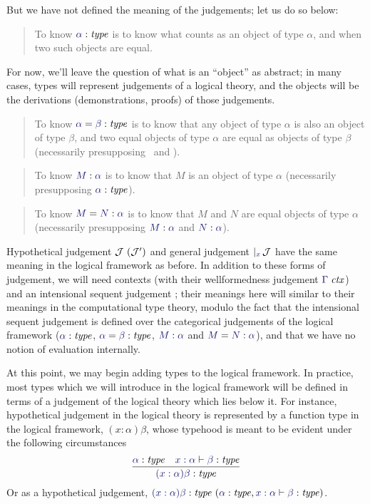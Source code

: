 \documentclass[main.tex]{subfiles}
\begin{document}
But we have not defined the meaning of the judgements; let us do so below:

\begin{quote}
  To know $\type\alpha$ is to know what counts as an object of type $\alpha$,
  and when two such objects are equal.
\end{quote}

For now, we'll leave the question of what is an ``object'' as
abstract; in many cases, types will represent judgements of a logical
theory, and the objects will be the derivations (demonstrations,
proofs) of those judgements.

\begin{quote}
  To know $\etype{\alpha}{\beta}$ is to know that any object of type $\alpha$ is
  also an object of type $\beta$, and two equal objects of type $\alpha$ are
  equal as objects of type $\beta$ (necessarily presupposing \type\alpha\ and
  \type\beta).
\end{quote}

\begin{quote}
  To know $\ofty{M}{\alpha}$ is to know that $M$ is an object of type $\alpha$
  (necessarily presupposing $\type\alpha$).
\end{quote}

\begin{quote}
  To know $\eofty{M}{N}{\alpha}$ is to know that $M$ and $N$ are equal objects of type
  $\alpha$ (necessarily presupposing $\ofty{M}{\alpha}$ and $\ofty{N}{\alpha}$).
\end{quote}

Hypothetical judgement $\mathcal{J}\ (\mathcal{J}')$ and general judgement
$\genj{x}{\mathcal{J}}$ have the same meaning in the logical framework as
before. In addition to these forms of judgement, we will need contexts (with
their wellformedness judgement $\isctx{\Gamma}$) and an intensional sequent
judgement ; their meanings here
will similar to their meanings in the computational type theory, modulo the
fact that the intensional sequent judgement is defined over the categorical
judgements of the logical framework ($\type\alpha$, $\etype{\alpha}{\beta}$,
$\ofty{M}{\alpha}$ and $\eofty{M}{N}{\alpha}$), and that we have no notion of
evaluation internally.

At this point, we may begin adding types to the logical framework. In
practice, most types which we will introduce in the logical framework
will be defined in terms of a judgement of the logical theory which
lies below it.  For instance, hypothetical judgement in the logical
theory is represented by a function type in the logical framework,
$(x:\alpha)\beta$, whose typehood is meant to be evident under the
following circumstances
\[
  \infer{
    \type{(x:\alpha)\beta}
  }{
    \type\alpha &
    \lfsequent{x:\alpha}{\type\beta}
  }
\]
Or as a hypothetical judgement,
$\hyp{\type{(x:\alpha)\beta}}{\type\alpha,\lfsequent{x:\alpha}{\type\beta}}$.
\end{document}

